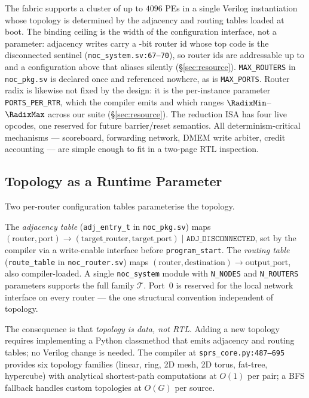 \documentclass[journal,10pt]{IEEEtran}
\theoremstyle{plain}
\theoremstyle{definition}
\theoremstyle{remark}
\newcommand{\sv}[1]{\texttt{#1}}
\newcommand{\T}{\ensuremath{\mathcal{T}}}
\begin{document}
The fabric supports a cluster of up to $4096$ PEs in a single Verilog
instantiation whose topology is determined by the adjacency and routing
tables loaded at boot. The binding ceiling is the width of the
configuration interface, not a parameter: adjacency writes carry a
\RouterIdBits-bit router id whose top code is the disconnected sentinel
(\sv{noc\_system.sv:67--70}), so router ids are addressable up to
\RouterIdMax{} and a configuration above that aliases silently
(\S\ref{sec:resource}). \sv{MAX\_ROUTERS} in \sv{noc\_pkg.sv} is declared
once and referenced nowhere, as is \sv{MAX\_PORTS}. Router radix is likewise
not fixed by the design:
it is the per-instance parameter \sv{PORTS\_PER\_RTR}, which the compiler
emits and which ranges $\RadixMin$--$\RadixMax$ across our suite
(\S\ref{sec:resource}). The reduction ISA has four live opcodes, one
reserved for future barrier/reset semantics. All determinism-critical
mechanisms --- scoreboard, forwarding network, DMEM write arbiter, credit
accounting --- are simple enough to fit in a two-page RTL inspection.

\subsection{Topology as a Runtime Parameter}\label{sec:fabric-topo}

Two per-router configuration tables parameterise the topology.

The \emph{adjacency table} (\sv{adj\_entry\_t} in \sv{noc\_pkg.sv}) maps
$(\text{router}, \text{port}) \to (\text{target\_router},
\text{target\_port}) \mid \sv{ADJ\_DISCONNECTED}$, set by the compiler via
a write-enable interface before \texttt{program\_start}. The
\emph{routing table} (\sv{route\_table} in \sv{noc\_router.sv}) maps
$(\text{router}, \text{destination}) \to \text{output\_port}$, also
compiler-loaded. A single \sv{noc\_system} module with \sv{N\_NODES} and
\sv{N\_ROUTERS} parameters supports the full family $\T$. Port~0 is
reserved for the local network interface on every router --- the one
structural convention independent of topology.

The consequence is that \emph{topology is data, not RTL}. Adding a new
topology requires implementing a Python classmethod that emits adjacency
and routing tables; no Verilog change is needed. The compiler at
\sv{sprs\_core.py:487--695} provides six topology families (linear, ring,
2D mesh, 2D torus, fat-tree, hypercube) with analytical
shortest-path computations at $O(1)$ per pair; a BFS fallback handles
custom topologies at $O(G)$ per source.
\end{document}
